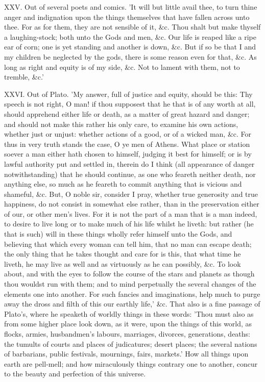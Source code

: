 XXV. Out of several poets and comics. 'It will but little avail thee,
to turn thine anger and indignation upon the things themselves that have
fallen across unto thee. For as for them, they are not sensible of it,
\&c. Thou shalt but make thyself a laughing-stock; both unto the Gods
and men, \&c. Our life is reaped like a ripe ear of corn; one is yet
standing and another is down, \&c. But if so be that I and my children
be neglected by the gods, there is some reason even for that, \&c. As
long as right and equity is of my side, \&c. Not to lament with them,
not to tremble, \&c.'

XXVI. Out of Plato. 'My answer, full of justice and equity, should be
this: Thy speech is not right, O man! if thou supposest that he that is of
any worth at all, should apprehend either life or death, as a matter of
great hazard and danger; and should not make this rather his only care, to
examine his own actions, whether just or unjust: whether actions of a
good, or of a wicked man, \&c. For thus in very truth stands the case,
O ye men of Athens. What place or station soever a man either hath chosen
to himself, judging it best for himself; or is by lawful authority put and
settled in, therein do I think (all appearance of danger notwithstanding)
that he should continue, as one who feareth neither death, nor anything
else, so much as he feareth to commit anything that is vicious and
shameful, \&c. But, O noble sir, consider I pray, whether true
generosity and true happiness, do not consist in somewhat else rather,
than in the preservation either of our, or other men's lives. For it is
not the part of a man that is a man indeed, to desire to live long or to
make much of his life whilst he liveth: but rather (he that is such) will
in these things wholly refer himself unto the Gods, and believing that
which every woman can tell him, that no man can escape death; the only
thing that he takes thought and care for is this, that what time he
liveth, he may live as well and as virtuously as he can possibly, \&c.
To look about, and with the eyes to follow the course of the stars and
planets as though thou wouldst run with them; and to mind perpetually the
several changes of the elements one into another. For such fancies and
imaginations, help much to purge away the dross and filth of this our
earthly life,' \&c. That also is a fine passage of Plato's, where he
speaketh of worldly things in these words: 'Thou must also as from some
higher place look down, as it were, upon the things of this world, as
flocks, armies, husbandmen's labours, marriages, divorces, generations,
deaths: the tumults of courts and places of judicatures; desert places;
the several nations of barbarians, public festivals, mournings, fairs,
markets.' How all things upon earth are pell-mell; and how miraculously
things contrary one to another, concur to the beauty and perfection of
this universe.

